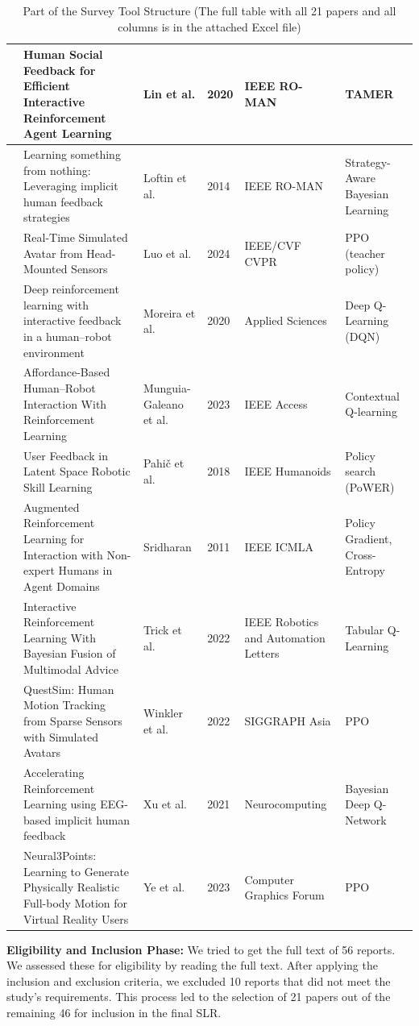 \documentclass[rnd]{mas_proposal}
\begin{document}
\begin{table}
\begin{tabular}{|L{0.3cm}|L{5.5cm}|L{2cm}|L{0.6cm}|L{1.8cm}|L{2.2cm}|}
\hline
\cite{Lin2020a} & Human Social Feedback for Efficient Interactive Reinforcement Agent Learning & Lin et al. & 2020 & IEEE RO-MAN & TAMER \\
\hline
\cite{Loftin2014} & Learning something from nothing: Leveraging implicit human feedback strategies & Loftin et al. & 2014 & IEEE RO-MAN & Strategy-Aware Bayesian Learning \\
\hline
\cite{Luo2024} & Real-Time Simulated Avatar from Head-Mounted Sensors & Luo et al. & 2024 & IEEE/CVF CVPR & PPO (teacher policy) \\
\hline
\cite{Moreira2020} & Deep reinforcement learning with interactive feedback in a human--robot environment & Moreira et al. & 2020 & Applied Sciences & Deep Q-Learning (DQN) \\
\hline
\cite{MunguiaGaleano2023} & Affordance-Based Human–Robot Interaction With Reinforcement Learning & Munguia-Galeano et al. & 2023 & IEEE Access & Contextual Q-learning \\
\hline
\cite{8624972} & User Feedback in Latent Space Robotic Skill Learning & Pahič et al. & 2018 & IEEE Humanoids & Policy search (PoWER) \\
\hline
\cite{6147010} & Augmented Reinforcement Learning for Interaction with Non-expert Humans in Agent Domains & Sridharan & 2011 & IEEE ICMLA & Policy Gradient, Cross-Entropy \\
\hline
\cite{9794595} & Interactive Reinforcement Learning With Bayesian Fusion of Multimodal Advice & Trick et al. & 2022 & IEEE Robotics and Automation Letters & Tabular Q-Learning \\
\hline
\cite{Winkler2022} & QuestSim: Human Motion Tracking from Sparse Sensors with Simulated Avatars & Winkler et al. & 2022 & SIGGRAPH Asia & PPO \\
\hline
\cite{Xu2021} & Accelerating Reinforcement Learning using EEG-based implicit human feedback & Xu et al. & 2021 & Neurocomputing & Bayesian Deep Q-Network \\
\hline
\cite{Ye2022} & Neural3Points: Learning to Generate Physically Realistic Full-body Motion for Virtual Reality Users & Ye et al. & 2023 & Computer Graphics Forum & PPO \\
\hline
\end{tabular}
\caption{Part of the Survey Tool Structure (The full table with all 21 papers and all columns is in the attached Excel file)}
\label{tab:survey_tool}
\end{table}

\textbf{Eligibility and Inclusion Phase:} We tried to get the full text of 56 reports. We assessed these for eligibility by reading the full text. After applying the inclusion and exclusion criteria, we excluded 10 reports that did not meet the study's requirements. This process led to the selection of 21 papers out of the remaining 46 for inclusion in the final SLR.
\end{document}
